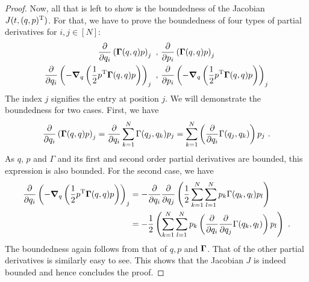 \begin{proof}
	Now, all that is left to show is the boundedness of the Jacobian $J(t, (q, p)^{\mathrm{T}})$.
	For that, we have to prove the boundedness of four types of partial derivatives for $i, j \in [N]$:
	\begin{align}
		\frac{\partial}{\partial q_{i}} \left(\bGamma(q, q) p\right)_j \ ,\
		&\frac{\partial}{\partial p_{i}} \left(\bGamma(q, q) p\right)_j \\
		\frac{\partial}{\partial q_{i}} \left(-\grad_q \left(\frac{1}{2} p^\mathrm{T} \bGamma(q, q) p\right)\right)_j \ ,\
		&\frac{\partial}{\partial p_{i}} \left(-\grad_q \left(\frac{1}{2} p^\mathrm{T} \bGamma(q, q) p\right)\right)_j\\
	\end{align}
	The index $j$ signifies the entry at position $j$.
	We will demonstrate the boundedness for two cases.
	First, we have
	\begin{equation}
		\frac{\partial}{\partial q_{i}} \left(\mathbf{\Gamma}(q, q) p\right)_j
		= \frac{\partial}{\partial q_{i}} \sum_{k=1}^N \Gamma(q_j, q_k) p_j
		=  \sum_{k=1}^N \left(\frac{\partial}{\partial q_{i}} \Gamma(q_j, q_k)\right) p_j \ .
	\end{equation}
	As $q$, $p$ and $\Gamma$ and its first and second order partial derivatives are bounded, this expression is also bounded.
	For the second case, we have
	\begin{align}
		\frac{\partial}{\partial q_{i}} \left(-\grad_q \left(\frac{1}{2} p^\mathrm{T} \bGamma(q, q) p\right)\right)_j
		&= - \frac{\partial}{\partial q_i} \frac{\partial}{\partial q_j} \left(\frac{1}{2}
		\sum_{k=1}^N\sum_{l=1}^{N} p_k \Gamma(q_k, q_l) p_l\right)\\
		&= -\frac{1}{2} \left(
		\sum_{k=1}^N\sum_{l=1}^{N} p_k \left(\frac{\partial}{\partial q_i} \frac{\partial}{\partial q_j} \Gamma(q_k, q_l)\right) p_l\right) \ .
	\end{align}
	The boundedness again follows from that of $q, p$ and $\mathbf{\Gamma}$.
	That of the other partial derivatives is similarly easy to see.
	This shows that the Jacobian $J$ is indeed bounded and hence concludes the proof.
	

\end{proof}
